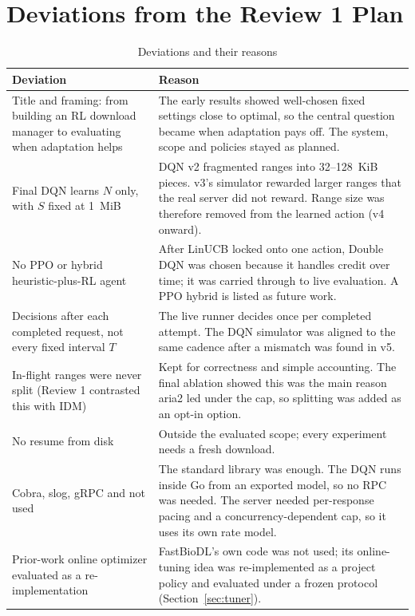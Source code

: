 \section{Deviations from the Review 1 Plan}
\begin{table}[H]\centering
\caption{Deviations and their reasons}\label{tab:deviations}
\begin{tabularx}{\linewidth}{@{}P{4.2cm}L@{}}
\toprule
\textbf{Deviation} & \textbf{Reason}\\
\midrule
Title and framing: from building an RL download manager to evaluating when adaptation helps & The early results showed well-chosen fixed settings close to optimal, so the central question became when adaptation pays off. The system, scope and policies stayed as planned.\\
Final DQN learns $N$ only, with $S$ fixed at 1~MiB & DQN v2 fragmented ranges into 32--128~KiB pieces. v3's simulator rewarded larger ranges that the real server did not reward. Range size was therefore removed from the learned action (v4 onward).\\
No PPO or hybrid heuristic-plus-RL agent & After LinUCB locked onto one action, Double DQN was chosen because it handles credit over time; it was carried through to live evaluation. A PPO hybrid is listed as future work.\\
Decisions after each completed request, not every fixed interval $T$ & The live runner decides once per completed attempt. The DQN simulator was aligned to the same cadence after a mismatch was found in v5.\\
In-flight ranges were never split (Review 1 contrasted this with IDM) & Kept for correctness and simple accounting. The final ablation showed this was the main reason aria2 led under the cap, so splitting was added as an opt-in option.\\
No resume from disk & Outside the evaluated scope; every experiment needs a fresh download.\\
Cobra, slog, gRPC and  not used & The standard library was enough. The DQN runs inside Go from an exported model, so no RPC was needed. The server needed per-response pacing and a concurrency-dependent cap, so it uses its own rate model.\\
Prior-work online optimizer evaluated as a re-implementation & FastBioDL's own code was not used; its online-tuning idea was re-implemented as a project policy and evaluated under a frozen protocol (Section~\ref{sec:tuner}).\\
\bottomrule
\end{tabularx}
\end{table}

